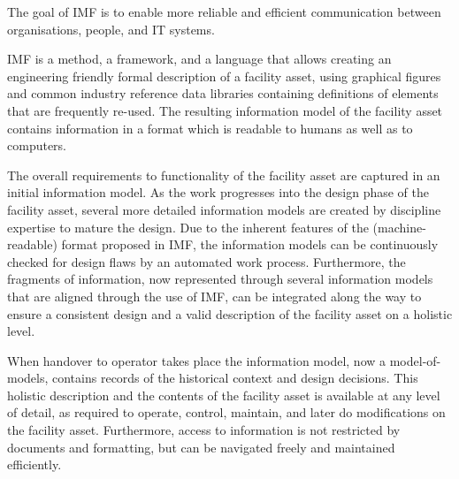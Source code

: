 \documentclass[../main.tex]{subfiles}
\begin{document}
The goal of IMF is to enable more reliable and efficient communication between organisations, people, and IT systems.

IMF is a method, a framework, and a language that allows creating an engineering friendly formal description of a facility asset, using graphical figures and common industry reference data libraries containing definitions of elements that are frequently re-used. The resulting information model of the facility asset contains information in a format which is readable to humans as well as to computers.

The overall requirements to functionality of the facility asset are captured in an initial information model. As the work progresses into the design phase of the facility asset, several more detailed information models are created by discipline expertise to mature the design. Due to the inherent features of the (machine-readable) format proposed in IMF, the information models can be continuously checked for design flaws by an automated work process. Furthermore, the fragments of information, now represented through several information models that are aligned through the use of IMF, can be integrated along the way to ensure a consistent design and a valid description of the facility asset on a holistic level.

When handover to operator takes place the information model, now a model-of-models, contains records of the historical context and design decisions. This holistic description and the contents of the facility asset is available at any level of detail, as required to operate, control, maintain, and later do modifications on the facility asset. Furthermore, access to information is not restricted by documents and formatting, but can be navigated freely and maintained efficiently.
\end{document}
